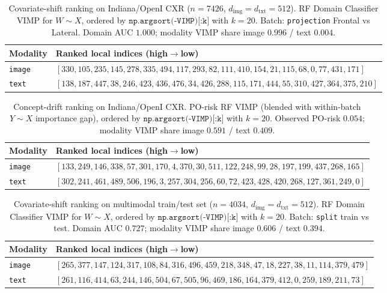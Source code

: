 
\begin{table}[ht]
\centering
\caption{Covariate-shift ranking on Indiana/OpenI CXR ($n{=}7426$, $d_{\mathrm{img}}{=}d_{\mathrm{txt}}{=}512$).
RF Domain Classifier VIMP for $W\sim X$, ordered by $\texttt{np.argsort(-VIMP)[:k]}$ with $k{=}20$.
Batch: \texttt{projection} Frontal vs Lateral. Domain AUC $1.000$; modality VIMP share image $0.996$ / text $0.004$.}
\label{tab:imgtxt-indiana-cs-rank}
\small
\begin{tabular}{@{}l p{11.5cm}@{}}
\toprule
Modality & Ranked local indices (high$\to$low) \\
\midrule
\texttt{image} & $[330,105,235,145,278,335,494,117,293,82,111,410,154,21,115,68,0,77,431,171]$ \\
\texttt{text}  & $[138,187,447,38,246,423,436,476,34,426,288,115,171,444,55,310,427,364,375,210]$ \\
\bottomrule
\end{tabular}
\end{table}

\begin{table}[ht]
\centering
\caption{Concept-drift ranking on Indiana/OpenI CXR.
PO-risk RF VIMP (blended with within-batch $Y\sim X$ importance gap), ordered by $\texttt{np.argsort(-VIMP)[:k]}$ with $k{=}20$.
Observed PO-risk $0.054$; modality VIMP share image $0.591$ / text $0.409$.}
\label{tab:imgtxt-indiana-cd-rank}
\small
\begin{tabular}{@{}l p{11.5cm}@{}}
\toprule
Modality & Ranked local indices (high$\to$low) \\
\midrule
\texttt{image} & $[133,249,146,338,57,301,170,4,370,30,511,122,248,99,28,197,199,437,268,165]$ \\
\texttt{text}  & $[302,241,461,489,506,196,3,257,304,256,60,72,423,428,420,268,127,361,249,0]$ \\
\bottomrule
\end{tabular}
\end{table}

\begin{table}[ht]
\centering
\caption{Covariate-shift ranking on multimodal train/test set ($n{=}4034$, $d_{\mathrm{img}}{=}d_{\mathrm{txt}}{=}512$).
RF Domain Classifier VIMP for $W\sim X$, ordered by $\texttt{np.argsort(-VIMP)[:k]}$ with $k{=}20$.
Batch: \texttt{split} train vs test. Domain AUC $0.727$; modality VIMP share image $0.606$ / text $0.394$.}
\label{tab:imgtxt-mm-cs-rank}
\small
\begin{tabular}{@{}l p{11.5cm}@{}}
\toprule
Modality & Ranked local indices (high$\to$low) \\
\midrule
\texttt{image} & $[265,377,147,124,317,108,84,316,496,459,218,348,47,18,227,38,11,114,379,479]$ \\
\texttt{text}  & $[261,116,414,63,244,146,504,67,505,96,469,186,164,379,412,0,259,189,211,73]$ \\
\bottomrule
\end{tabular}
\end{table}

